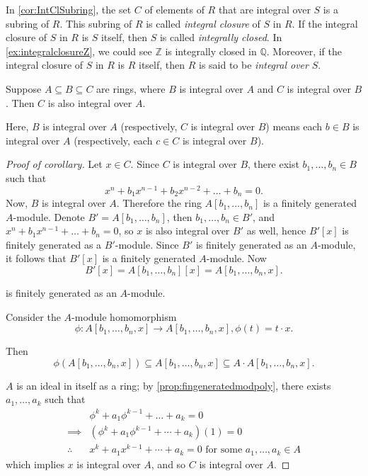 In \autoref{cor:IntClSubring}, the set \( C \) of elements of \( R \) that are integral over \( S \) is a subring of  \( R \). This subring of  \( R \) is called  \emph{integral closure} of \( S \) in  \( R \). If the integral closure of \( S \) in  \( R \) is  \( S \) itself, then  \( S \) is called \emph{integrally closed}. In \autoref{ex:integralclosureZ}, we could see \( \mathbb{Z} \) is integrally closed in \( \mathbb{Q} \). Moreover, if the integral closure of  \( S \) in  \( R \) is  \( R \)  itself, then \( R \) is said to be  \emph{integral over} \( S \).
\begin{corollary}\label{cor:IntDepTrans}
  Suppose \( A \subseteq B \subseteq C \) are rings, where \( B \) is integral over  \( A \) and  \( C \) is integral over  \( B \). Then  \( C \) is also integral over  \( A \). 
\end{corollary}
Here, \( B \) is integral over  \( A \) (respectively, \( C \) is integral over  \( B \)) means each \( b \in B \) is integral over \( A \) (respectively, each \( c \in C \) is integral over  \( B \)).
\begin{proof}[Proof of corollary]
  Let \(x \in C\). Since \(C\) is integral over \(B\), there exist \(b_1,\dots,b_n \in B\) such that
\[
x^n + b_1 x^{n-1} + b_2 x^{n-2} + \dots + b_n = 0. \tag{1}
\]
Now, \(B\) is integral over \(A\). Therefore the ring \(A[b_1,\dots,b_n]\) is a finitely generated \(A\)-module. Denote \(B' = A[b_1,\dots,b_n]\), then \(b_1,\dots,b_n \in B'\), and \( x^n + b_1x^{n-1} + \ldots + b_n = 0 \), so \(x\) is also integral over \(B'\) as well, hence \(B'[x]\) is finitely generated as a \(B'\)-module. Since \(B'\) is finitely generated as an \(A\)-module, it follows that \(B'[x]\) is a finitely generated \(A\)-module. Now
\[
B'[x] = A[b_1,\dots,b_n][x] = A[b_1,\dots,b_n,x].
\]

is finitely generated as an \( A \)-module. 

Consider the \(A\)-module homomorphism
\[
\phi : A[b_1,\dots,b_n,x] \to A[b_1,\dots,b_n,x], \phi(t) = t \cdot x.
\]

Then 
\[
  \phi(A[b_1, \ldots, b_n, x]) \subseteq A[b_1, \ldots, b_n, x] \subseteq A \cdot A[b_1, \ldots, b_n, x].
\] 

\( A \) is an ideal in itself as a ring; by \autoref{prop:fingeneratedmodpoly},  there exists \( a_1, \ldots, a_k \) such that
  \begin{align*}
    & \phi^k + a_1\phi^{k-1} + \ldots + a_k = 0\\
    \implies & (\phi^k + a_1\phi^{k-1} + \cdots + a_k)(1) = 0\\
    \therefore~&x^k + a_1x^{k-1} + \cdots + a_k = 0 \text{ for some }  a_1, \ldots, a_k \in A
  \end{align*} 
which implies \( x \) is integral over  \( A \), and so  \( C \) is integral over  \( A \).
\end{proof}
